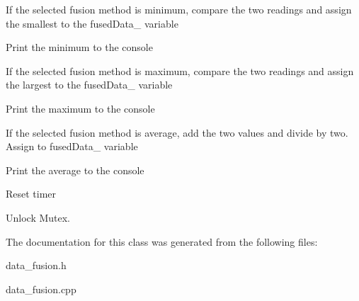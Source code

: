If the selected fusion method is minimum, compare the two readings and assign the smallest to the fused\+Data\+\_\+ variable

Print the minimum to the console

If the selected fusion method is maximum, compare the two readings and assign the largest to the fused\+Data\+\_\+ variable

Print the maximum to the console

If the selected fusion method is average, add the two values and divide by two. Assign to fused\+Data\+\_\+ variable

Print the average to the console

Reset timer

Unlock Mutex. 

The documentation for this class was generated from the following files\+:\begin{DoxyCompactItemize}
\item 
data\+\_\+fusion.\+h\item 
data\+\_\+fusion.\+cpp\end{DoxyCompactItemize}
